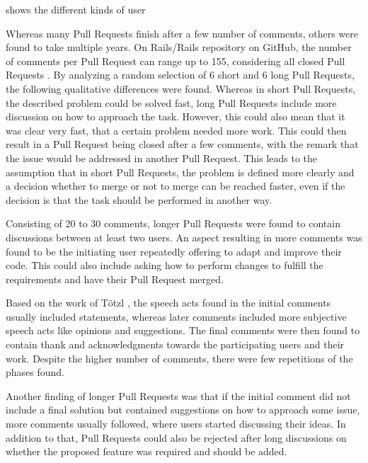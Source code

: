  shows the different kinds of user



Whereas many Pull Requests finish after a few number of comments, others were found to take multiple years. On Rails/Rails repository on GitHub, the number of comments per Pull Request can range up to 155, considering all closed Pull Requests \cite{noauthor_pull_railsrails_nodate}. By analyzing a random selection of 6 short and 6 long Pull Requests, the following qualitative differences were found. Whereas in short Pull Requests, the described problem could be solved fast, long Pull Requests include more discussion on how to approach the task. However, this could also mean that it was clear very fast, that a certain problem needed more work. This could then result in a Pull Request being closed after a few comments, with the remark that the issue would be addressed in another Pull Request. This leads to the assumption that in short Pull Requests, the problem is defined more clearly and a decision whether to merge or not to merge can be reached faster, even if the decision is that the task should be performed in another way. 

Consisting of 20 to 30 comments, longer Pull Requests were found to contain discussions between at least two users. An aspect resulting in more comments was found to be the initiating user repeatedly offering to adapt and improve their code. This could also include asking how to perform changes to fulfill the requirements and have their Pull Request merged. 

Based on the work of Tötzl \cite{thesisgithub}, the speech acts found in the initial comments usually included statements, whereas later comments included more subjective speech acts like opinions and suggestions. The final comments were then found to contain thank and acknowledgments towards the participating users and their work. Despite the higher number of comments, there were few repetitions of the phases found. %

Another finding of longer Pull Requests was that if the initial comment did not include a final solution but contained suggestions on how to approach some issue, more comments usually followed, where users started discussing their ideas. In addition to that, Pull Requests could also be rejected after long discussions on whether the proposed feature was required and should be added. 



